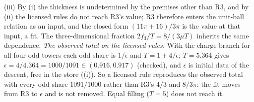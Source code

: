 (iii) By (i) the thickness is undetermined by the premises other than R3, and by (ii) the licensed rules do not reach R3's value; R3 therefore enters the unit-ball relation as an input, and the closed form $(11\pi + 16)/3\pi$ is the value at that input, a fit. The three-dimensional fraction $2f_{3}/T = 8/(3\mu T)$ inherits the same dependence. \emph{The observed total on the licensed rules.} With the charge branch for all four odd towers each odd share is $1/\epsilon$ and $T = 1 + 4/\epsilon$; $T = 5.364$ gives $\epsilon = 4/4.364 = 1000/1091 \in (0.916, 0.917)$ (checked), and $\epsilon$ is initial data of the descent, free in the store ((i)). So a licensed rule reproduces the observed total with every odd share $1091/1000$ rather than R3's $4/3$ and $8/3\pi$: the fit moves from R3 to $\epsilon$ and is not removed. Equal filling ($T = 5$) does not reach it.
